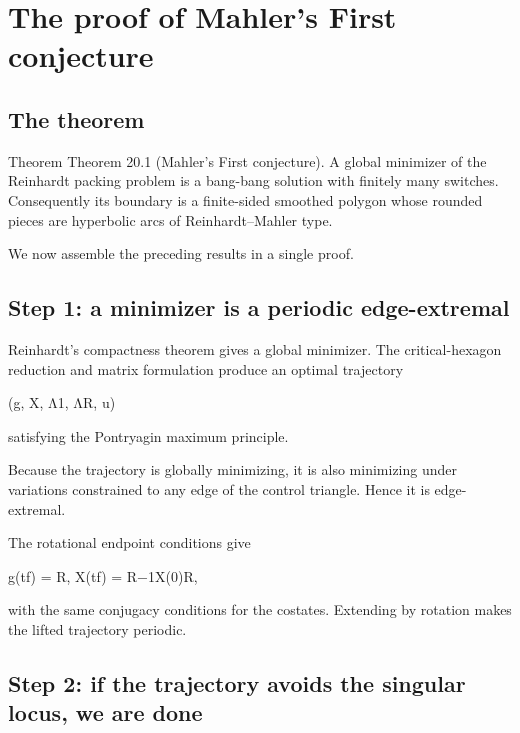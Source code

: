 \chapter{The proof of Mahler's First conjecture}
\section{The theorem}

\begin{statementbox}{Theorem}
Theorem 20.1 (Mahler’s First conjecture). A global minimizer of the Reinhardt packing problem is a bang-bang solution with finitely many switches. Consequently its boundary is a finite-sided smoothed polygon whose rounded pieces are hyperbolic arcs of Reinhardt–Mahler type.
\end{statementbox}

We now assemble the preceding results in a single proof.


\section{Step 1: a minimizer is a periodic edge-extremal}

Reinhardt’s compactness theorem gives a global minimizer. The critical-hexagon reduction and matrix formulation produce an optimal trajectory


\begin{displaytext}
(g, X, Λ1, ΛR, u)
\end{displaytext}

satisfying the Pontryagin maximum principle.


Because the trajectory is globally minimizing, it is also minimizing under variations constrained to any edge of the control triangle. Hence it is edge-extremal.


The rotational endpoint conditions give


\begin{displaytext}
g(tf) = R, X(tf) = R−1X(0)R,
\end{displaytext}

with the same conjugacy conditions for the costates. Extending by rotation makes the lifted trajectory periodic.


\section{Step 2: if the trajectory avoids the singular locus, we are done}


